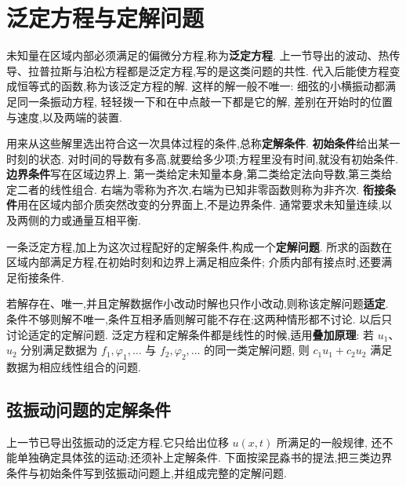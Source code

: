 \section{泛定方程与定解问题}

未知量在区域内部必须满足的偏微分方程,称为\textbf{泛定方程}.
上一节导出的波动、热传导、拉普拉斯与泊松方程都是泛定方程,写的是这类问题的共性.
代入后能使方程变成恒等式的函数,称为该泛定方程的解.
这样的解一般不唯一:
细弦的小横振动都满足同一条振动方程,
轻轻拨一下和在中点敲一下都是它的解,
差别在开始时的位置与速度,以及两端的装置.

用来从这些解里选出符合这一次具体过程的条件,总称\textbf{定解条件}.
\textbf{初始条件}给出某一时刻的状态.
对时间的导数有多高,就要给多少项;方程里没有时间,就没有初始条件.
\textbf{边界条件}写在区域边界上.
第一类给定未知量本身,第二类给定法向导数,第三类给定二者的线性组合.
右端为零称为齐次,右端为已知非零函数则称为非齐次.
\textbf{衔接条件}用在区域内部介质突然改变的分界面上,不是边界条件.
通常要求未知量连续,以及两侧的力或通量互相平衡.

一条泛定方程,加上为这次过程配好的定解条件,构成一个\textbf{定解问题}.
所求的函数在区域内部满足方程,在初始时刻和边界上满足相应条件;
介质内部有接点时,还要满足衔接条件.

若解存在、唯一,并且定解数据作小改动时解也只作小改动,则称该定解问题\textbf{适定}.
条件不够则解不唯一,条件互相矛盾则解可能不存在;这两种情形都不讨论.
以后只讨论适定的定解问题.
泛定方程和定解条件都是线性的时候,适用\textbf{叠加原理}:
若 $u_1$、$u_2$ 分别满足数据为 $f_1,\varphi_1,\ldots$ 与 $f_2,\varphi_2,\ldots$ 的同一类定解问题,
则 $c_1 u_1+c_2 u_2$ 满足数据为相应线性组合的问题.

\subsection{弦振动问题的定解条件}

上一节已导出弦振动的泛定方程.它只给出位移 $u(x,t)$ 所满足的一般规律,
还不能单独确定具体弦的运动;还须补上定解条件.
下面按梁昆淼书的提法,把三类边界条件与初始条件写到弦振动问题上,并组成完整的定解问题.

